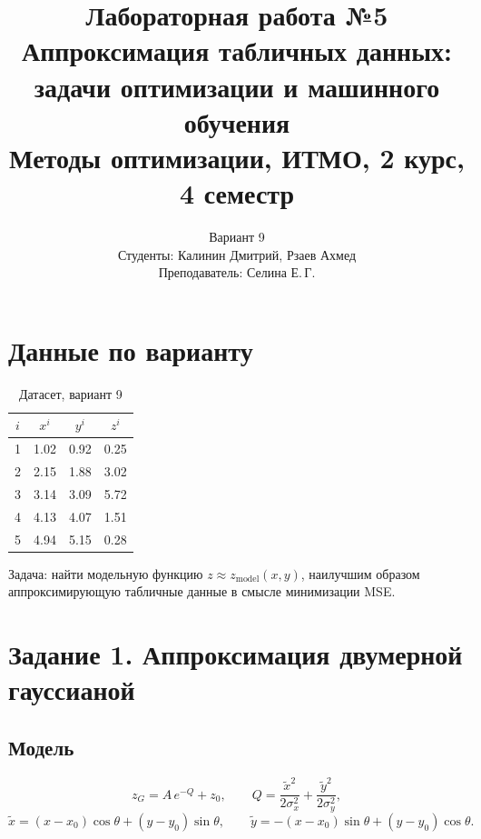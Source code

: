 \documentclass[12pt,a4paper]{article}
\title{\textbf{Лабораторная работа №5}\\
\large Аппроксимация табличных данных:\\задачи оптимизации и машинного обучения\\[0.5em]
\normalsize Методы оптимизации, ИТМО, 2 курс, 4 семестр}
\author{%
  Вариант 9\\[0.4em]
  Студенты: Калинин Дмитрий, Рзаев Ахмед\\
  Преподаватель: Селина Е.\,Г.
}
\date{}
\begin{document}
\maketitle
\tableofcontents
\newpage

\section{Данные по варианту}

\begin{table}[H]
\centering
\caption{Датасет, вариант 9}
\begin{tabular}{cccc}
\toprule
$i$ & $x^i$ & $y^i$ & $z^i$ \\
\midrule
1 & 1.02 & 0.92 & 0.25 \\
2 & 2.15 & 1.88 & 3.02 \\
3 & 3.14 & 3.09 & 5.72 \\
4 & 4.13 & 4.07 & 1.51 \\
5 & 4.94 & 5.15 & 0.28 \\
\bottomrule
\end{tabular}
\end{table}

Задача: найти модельную функцию $z \approx z_{\text{model}}(x, y)$, наилучшим образом
аппроксимирующую табличные данные в смысле минимизации MSE.


\section{Задание 1. Аппроксимация двумерной гауссианой}

\subsection{Модель}

\begin{equation}
  z_G = A\,e^{-Q} + z_0, \qquad
  Q = \frac{\tilde{x}^2}{2\sigma_x^2} + \frac{\tilde{y}^2}{2\sigma_y^2},
\end{equation}
\begin{equation}
  \tilde{x} = (x - x_0)\cos\theta + (y - y_0)\sin\theta, \qquad
  \tilde{y} = -(x - x_0)\sin\theta + (y - y_0)\cos\theta.
\end{equation}
\end{document}
